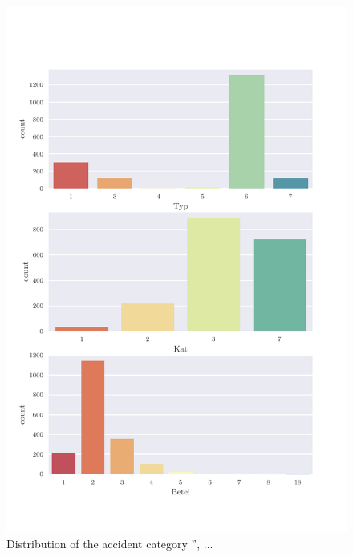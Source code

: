 \documentclass[a4paper,headsepline,footsepline,fontsize=11pt,BCOR=12mm,DIV=12]{report}
\begin{document}
\begin{appendices}
\begin{figure}[h]
	\centering
	\includegraphics[scale=0.7]{../CorrAnalysis/data/BAYSIS/02_matched/plots/baysis_matched_count_multiple01}
	\caption{Distribution of the accident category '', ...}
	\label{img:appendix_baysis_matched_01}
\end{figure}


\end{appendices}
\end{document}
